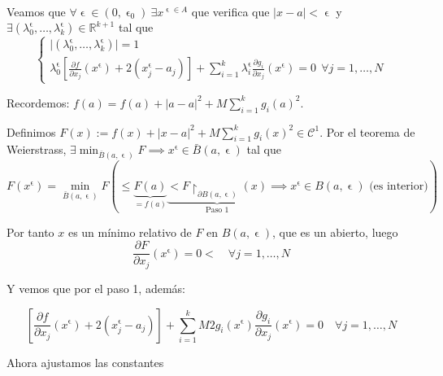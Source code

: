 \documentclass[11pt, a4paper]{article}
\makeatletter
\let\epsilon\upvarepsilon
\renewenvironment{proof}[1][\proofname] {\vspace{-15pt}\par\pushQED{\qed}\normalfont\topsep6\p@\@plus6\p@\relax\trivlist\item[\hskip\labelsep\it#1\@addpunct{.}]\ignorespaces}{\popQED\endtrivlist\@endpefalse}
\providecommand{\abs}[1]{\lvert#1\rvert}
\theoremstyle{theorem-style}
\theoremstyle{definition-style}
\theoremstyle{remark-style}
\theoremstyle{example-style}
\makeatother
\begin{document}
\begin{proof}[Demostración (método de penalización)]
	\hfill\\
	Veamos que $\forall \epsilon\in (0,\epsilon_0)\ \exists x^{\epsilon\in A}$ que verifica que $\abs{x-a} < \epsilon$ y $\exists(\lambda^{\epsilon}_0, \dots, \lambda_k^{\epsilon})\in \mathbb{R}^{k+1}$ tal que
	\[
		\begin{cases}
	\abs{(\lambda_0^{\epsilon}, \dots, \lambda_k^{\epsilon})} = 1\\
	\lambda_0^{\epsilon}\left[\displaystyle\frac{\partial f}{\partial x_j}(x^{\epsilon})+2(x_j^{\epsilon}-a_j)\right] + \displaystyle\sum_{i=1}^k \lambda_i^\epsilon \frac{\partial g_i}{\partial x_j}(x^{\epsilon}) = 0 \ \ \forall j=1,\dots,N
\end{cases}
	\]
	
	Recordemos: $f(a) = f(a)+\abs{a-a}^2+M\displaystyle\sum_{i=1}^k g_i(a)^2$.
	
	Definimos $F(x) := f(x) + \abs{x-a}^2 + M\displaystyle\sum_{i=1}^k g_i(x)^2 \in \mathcal{C}^1$. Por el teorema de Weierstrass, $\exists \min_{\bar{B}(a,\epsilon)} F \implies x^{\epsilon}\in \bar{B}(a,\epsilon)$ tal que
	\[
	F(x^{\epsilon}) = \min_{\bar{B}(a, \epsilon)} F \left( \le \underbrace{F(a)}_{=f(a)} \underbrace{<F\restriction_{\partial B(a,\epsilon)} (x)}_{\text{Paso 1}}\implies x^{\epsilon}\in B(a,\epsilon) \text{ (es interior)}  \right)
	\]
	
	Por tanto $x$ es un mínimo relativo de $F$ en $B(a,\epsilon)$, que es un abierto, luego \[\displaystyle \frac{\partial F}{\partial x_j}(x^{\epsilon}) = 0<\quad \forall j=1,\dots, N\] 
	
	Y vemos que por el paso 1, además:
	
	\[
	\left[\frac{\partial f}{\partial x_j}(x^{\epsilon}) + 2(x_j^{\epsilon}-a_j)\right]+\sum_{i=1}^k M2g_i(x^{\epsilon})\frac{\partial g_i}{\partial x_j}(x^{\epsilon}) = 0\quad \forall j=1,\dots,N
	\]
	
	Ahora ajustamos las constantes
	
\end{proof}
\end{document}
